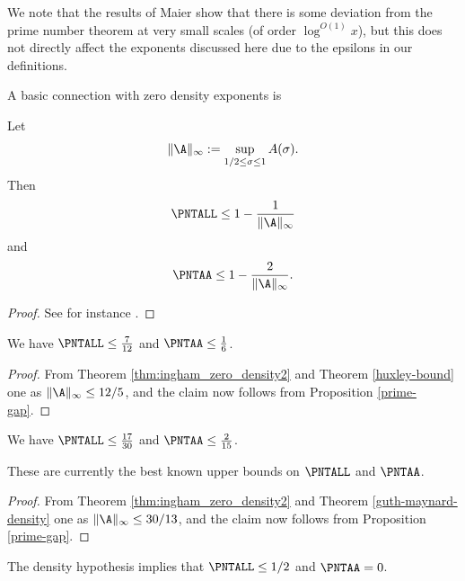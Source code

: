 We note that the results of Maier \cite{maier-primes} show that there is some deviation from the prime number theorem at very small scales (of order $\log^{O(1)} x$), but this does not directly affect the exponents discussed here due to the epsilons in our definitions.

A basic connection with zero density exponents is

\begin{proposition}\label{prime-gap}  Let
\begin{equation}\label{A-def}
    \|\A\|_\infty := \sup_{1/2 \leq \sigma \leq 1} A(\sigma).
\end{equation}
Then
    $$ \PNTALL \leq 1 - \frac{1}{\|\A\|_\infty}$$
    and
    $$ \PNTAA \leq 1 - \frac{2}{\|\A\|_\infty}.$$
\end{proposition}

\begin{proof} See for instance \cite[\S 13.2]{guth-maynard}.
\end{proof}

\begin{corollary}  We have $\PNTALL \leq \frac{7}{12}$ and $\PNTAA \leq \frac{1}{6}$.
\end{corollary}

\begin{proof}  From Theorem \ref{thm:ingham_zero_density2} and Theorem \ref{huxley-bound} one as $\|\A\|_\infty \leq 12/5$, and the claim now follows from Proposition \ref{prime-gap}.
\end{proof}

\begin{corollary}\cite{guth-maynard}  We have $\PNTALL \leq \frac{17}{30}$ and $\PNTAA \leq \frac{2}{15}$.
\end{corollary}

These are currently the best known upper bounds on $\PNTALL$ and $\PNTAA$.

\begin{proof}  From Theorem \ref{thm:ingham_zero_density2} and Theorem \ref{guth-maynard-density} one as $\|\A\|_\infty \leq 30/13$, and the claim now follows from Proposition \ref{prime-gap}.
\end{proof}

\begin{corollary}  The density hypothesis implies that $\PNTALL \leq 1/2$ and $\PNTAA = 0$.
\end{corollary}

